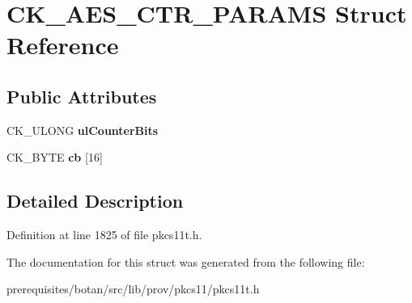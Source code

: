 \hypertarget{struct_c_k___a_e_s___c_t_r___p_a_r_a_m_s}{}\section{C\+K\+\_\+\+A\+E\+S\+\_\+\+C\+T\+R\+\_\+\+P\+A\+R\+A\+MS Struct Reference}
\label{struct_c_k___a_e_s___c_t_r___p_a_r_a_m_s}
\subsection*{Public Attributes}
\begin{DoxyCompactItemize}
\item 
\mbox{\label{struct_c_k___a_e_s___c_t_r___p_a_r_a_m_s_a54e9e91f82b31a9cbe343adaa31e3a3a}} 
C\+K\+\_\+\+U\+L\+O\+NG {\bfseries ul\+Counter\+Bits}
\item 
\mbox{\label{struct_c_k___a_e_s___c_t_r___p_a_r_a_m_s_ac56cd88bc06e232dd34f41843c7f8498}} 
C\+K\+\_\+\+B\+Y\+TE {\bfseries cb} \mbox{[}16\mbox{]}
\end{DoxyCompactItemize}


\subsection{Detailed Description}


Definition at line 1825 of file pkcs11t.\+h.



The documentation for this struct was generated from the following file\+:\begin{DoxyCompactItemize}
\item 
prerequisites/botan/src/lib/prov/pkcs11/pkcs11t.\+h\end{DoxyCompactItemize}
